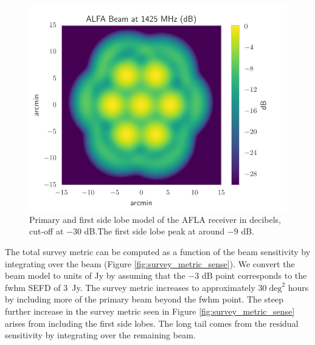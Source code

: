 \documentclass[a4paper,fleqn,usenatbib]{mnras}
\begin{document}
\begin{figure}
    \includegraphics[width=1.0\linewidth]{figures/ALFA_beam_1425MHz_dB.pdf}
    \caption{Primary and first side lobe model of the AFLA receiver in
    decibels, cut-off at $-30$ dB.The first side lobe peak at around $-9$ dB.
    }
    \label{fig:alfa_beam}
\end{figure}

The total survey metric can be computed as a function of the beam
sensitivity by integrating over the beam (Figure
\ref{fig:survey_metric_sense}). We convert the beam model to units of
Jy by assuming that the $-3$ dB point corresponds to the \gls{fwhm}
SEFD of 3~Jy. The survey metric increases to approximately $30 \;
\textrm{deg}^2$ hours by including more of the primary beam beyond the
\gls{fwhm} point. The steep further increase in the survey metric seen
in Figure \ref{fig:survey_metric_sense} arises from including the
first side lobes. The long tail comes from the residual sensitivity by
integrating over the remaining beam.
\end{document}
